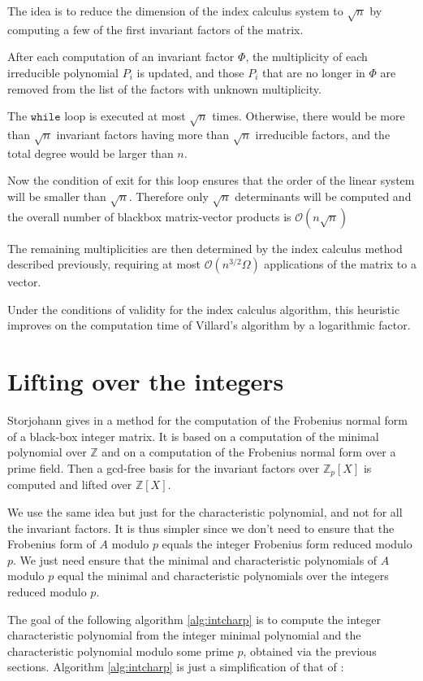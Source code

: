 \documentclass{article}
\newcommand{\GO}{\mathcal{ O}}
\newcommand{\Z}{\mathbb{Z}}
\begin{document}
The idea is to reduce the dimension of the index calculus system to $\sqrt{n}$ 
by computing a few of the first invariant factors of the matrix.

After each computation of an invariant factor $\Phi$, the multiplicity of
each irreducible polynomial $P_i$ is updated, and those $P_i$ that are no longer
in $\Phi$ are removed from the list of the factors with unknown multiplicity.

The $\texttt{while}$ loop is executed at most $\sqrt{n}$ times. Otherwise, there
would be more than $\sqrt{n}$ invariant factors having more than $\sqrt{n}$
irreducible factors, and the total degree would be larger than $n$.

Now the condition of exit for this loop ensures that the order of the
linear system will be smaller than $\sqrt{n}$. Therefore only $\sqrt{n}$
determinants will be computed and the overall number of blackbox matrix-vector products 
is $\GO(n\sqrt{n})$

The remaining multiplicities are then determined by the
index calculus method  described previously,
requiring at most $\GO(n^{3/2} \Omega) $ applications of the matrix to a vector.

Under the conditions of validity for the index calculus algorithm, this
heuristic improves on the computation time of Villard's algorithm by a logarithmic factor.

\section{Lifting over the integers}\label{sec:spint}

Storjohann gives in \cite{Storjohann:2000:Frob} a method for the
computation of the Frobenius normal form of a black-box integer
matrix. It is based on a computation of the minimal polynomial over
$\Z$ and on a computation of the Frobenius normal form over a prime
field. Then a gcd-free basis for the invariant factors over $\Z_p[X]$
is computed and lifted over $\Z[X]$. 

We use the same idea but just for the characteristic polynomial, and
not for all the invariant factors. It is
thus simpler since we don't need to ensure that the Frobenius form
of $A$ modulo $p$ equals the integer Frobenius form reduced modulo
$p$. We just need ensure that the minimal and characteristic 
polynomials of $A$ modulo
$p$ equal the minimal and characteristic polynomials over the integers
reduced modulo $p$.

The goal of the following algorithm \ref{alg:intcharp}
is to compute the
integer characteristic polynomial from the integer minimal polynomial
and the characteristic polynomial modulo some prime $p$, obtained via
the previous sections. Algorithm \ref{alg:intcharp} is just a
simplification of that of \cite{Storjohann:2000:Frob}:
\end{document}
